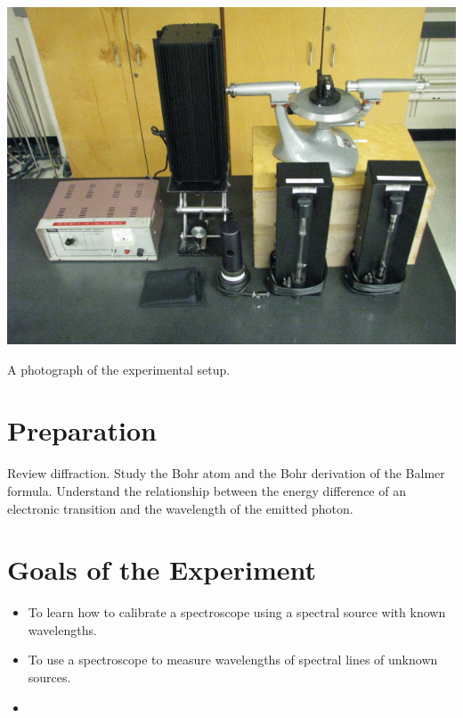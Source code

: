\begin{marginfigure}[+1in]
\includegraphics{Spectroscopy-Setup.jpg}
\caption{A photograph of the experimental setup.}
\label{fig:SPsetup}
\end{marginfigure}

\section{Preparation}
Review diffraction. Study the Bohr atom and the Bohr derivation of the Balmer formula. Understand the relationship between the energy difference of an electronic transition and the wavelength of the emitted photon.

\section{Goals of the Experiment}
\begin{itemize}
    \item To learn how to calibrate a spectroscope using a spectral source with known wavelengths.
    \item To use a spectroscope to measure wavelengths of spectral lines of unknown sources.
    \item 
\end{itemize}

